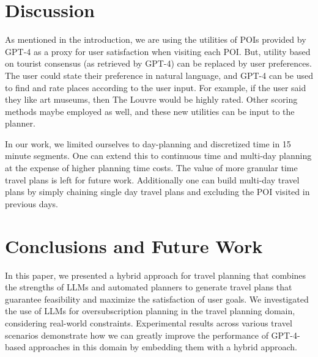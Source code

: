 \documentclass[letterpaper]{article}
\newcommand{\gpt}{{\sc GPT-4}\xspace}
\begin{document}
\section{Discussion}
As mentioned in the introduction, we are using the utilities of POIs provided by \gpt as a proxy for user satisfaction when visiting each POI. But, utility based on tourist consensus (as retrieved by \gpt) can be replaced by user preferences. The user could state their preference in natural language, and \gpt can be used to find and rate places according to the user input. For example, if the user said they like art museums, then The Louvre would be highly rated. Other scoring methods maybe employed as well, and these new utilities can be input to the planner.

In our work, we limited ourselves to day-planning and discretized time in 15 minute segments. One can extend this to continuous time and multi-day planning at the expense of higher planning time costs. The value of more granular time travel plans is left for future work. Additionally one can build multi-day travel plans by simply chaining single day travel plans and excluding the POI visited in previous days. 

\iffalse
\section{Extentions}
\begin{itemize}
    \item More LLMs in addition to \gpt
    \item Multi-day travel
    \item Gaps between activities
    \item Must-visit places (hard)
    \item User preferences (soft)
    \item Budget constraint
    \item Open time of POIs (e.g. museums)
    \item Full itinerary: hotel, flight, restaurant (and if reservations, then hard constraint)
    \item Try satisficing planners
\end{itemize}
\fi


\section{Conclusions and Future Work}
In this paper, we presented a hybrid approach for travel planning that combines the strengths of LLMs and automated planners to generate travel plans that guarantee feasibility and maximize the satisfaction of user goals. We investigated the use of LLMs for oversubscription planning in the travel planning domain, considering real-world constraints. Experimental results across various travel scenarios demonstrate how we can greatly improve the performance of \gpt-based approaches in this domain by embedding them with a hybrid approach. 
\end{document}
